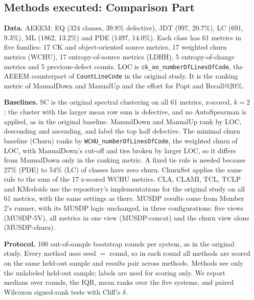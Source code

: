 
\subsection{Methods executed: Comparison Part}

\textbf{Data.} AEEEM: EQ (324 classes, 39.8\% defective), JDT (997, 20.7\%),
LC (691, 9.3\%), ML (1862, 13.2\%) and PDE (1497, 14.0\%). Each class has 61
metrics in five families: 17 CK and object-oriented source metrics, 17
weighted churn metrics (WCHU), 17 entropy-of-source metrics (LDHH), 5
entropy-of-change metrics and 5 previous-defect counts. LOC is
\texttt{ck\_oo\_numberOfLinesOfCode}, the AEEEM counterpart of
\texttt{CountLineCode} in the original study. It is the ranking metric of
ManualDown and ManualUp and the effort for Popt and Recall@20\%.

\textbf{Baselines.} SC is the original spectral clustering on all 61 metrics,
z-scored, $k=2$; the cluster with the larger mean row sum is defective, and no
AutoSpearman is applied, as in the original baseline. ManualDown and ManualUp
rank by LOC, descending and ascending, and label the top half defective. The
minimal churn baseline (Churn) ranks by \texttt{WCHU\_numberOfLinesOfCode},
the weighted churn of LOC, with ManualDown's cut-off and ties broken by larger
LOC, so it differs from ManualDown only in the ranking metric. A fixed tie
rule is needed because 27\% (PDE) to 54\% (LC) of classes have zero churn.
ChurnSet applies the same rule to the sum of the 17 z-scored WCHU metrics.
CLA, CLAMI, TCL, TCLP and KMedoids use the repository's implementations for
the original study on all 61 metrics, with the same settings as there.
MUSDP results come from Member 2's runner, with its MUSDP logic unchanged, in three
configurations: five views (MUSDP-5V), all metrics in one view
(MUSDP-concat) and the churn view alone (MUSDP-churn).

\textbf{Protocol.} 100 out-of-sample bootstrap rounds per system, as in the
original study. Every method uses seed $=$ round, so in each round all methods
are scored on the same held-out sample and results pair across methods.
Methods see only the unlabeled held-out sample; labels are used for scoring
only. We report medians over rounds, the IQR, mean ranks over the five
systems, and paired Wilcoxon signed-rank tests with Cliff's $\delta$.

